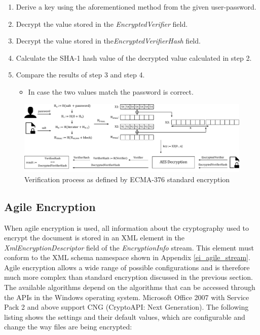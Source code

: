 \documentclass[11pt,oneside]{fithesis2}
\begin{document}
\begin{enumerate}
\setlength\itemsep{0.1em}
\item{Derive a key using the aforementioned method from the given user-password.}
\item{Decrypt the value stored in the \textit{EncryptedVerifier} field.}
\item{Decrypt the value stored in the\textit{EncryptedVerifierHash} field.}
\item{Calculate the SHA-1 hash value of the decrypted value calculated in step 2.}
\item{Compare the results of step 3 and step 4. 
	\begin{itemize}
		\item{In case the two values match the password is correct.}
	\end{itemize}}
\end{enumerate}

\begin{figure}[ht]
	\centering
	\includegraphics[width=1\textwidth]{figures/standard_encryption_scheme.pdf}
	\caption{Verification process as defined by ECMA-376 standard encryption}
	\label{standard_encryption_scheme}
\end{figure}

\subsection{Agile Encryption}

When agile encryption is used, all information about the cryptography used to encrypt the document is stored in an XML element in the \textit{XmlEncryptionDescriptor} field of the \textit{EncryptionInfo} stream. This element must conform to the XML schema namespace shown in Appendix \ref{ei_agile_stream}. Agile encryption allows a wide range of possible configurations and is therefore much more complex than standard encryption discussed in the previous section. The available algorithms depend on the algorithms that can be accessed through the APIs in the Windows operating system. Microsoft Office 2007 with Service Pack 2 and above support CNG (CryptoAPI: Next Generation). The following listing shows the settings and their default values, which are configurable and change the way files are being encrypted:
\end{document}

